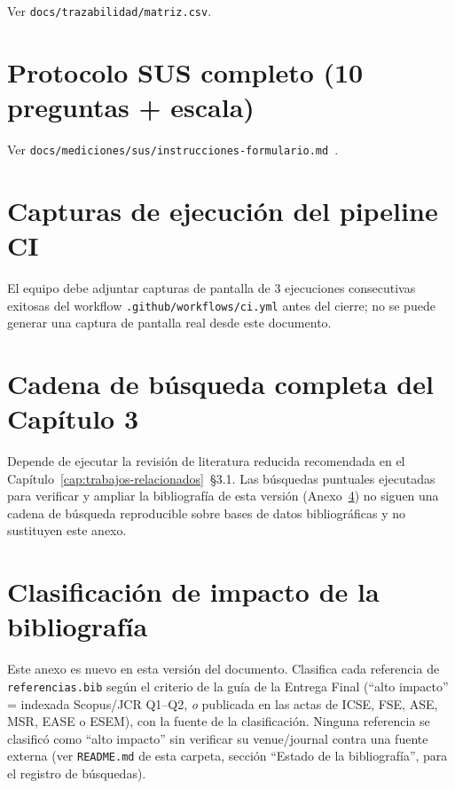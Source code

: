 Ver \texttt{docs/trazabilidad/matriz.csv}.

\chapter{Protocolo SUS completo (10 preguntas + escala)}
\label{anexo:g}

Ver \texttt{docs/mediciones/sus/instrucciones-formulario.md}~\cite{BROOKE1996}.

\chapter{Capturas de ejecución del pipeline CI}
\label{anexo:h}

El equipo debe adjuntar capturas de pantalla de 3 ejecuciones
consecutivas exitosas del workflow \texttt{.github/workflows/ci.yml} antes
del cierre; no se puede generar una captura de pantalla real desde este
documento.

\chapter{Cadena de búsqueda completa del Capítulo 3}
\label{anexo:i}

Depende de ejecutar la revisión de literatura reducida
recomendada en el Capítulo~\ref{cap:trabajos-relacionados}~\S3.1. Las
búsquedas puntuales ejecutadas para verificar y ampliar la bibliografía de
esta versión (Anexo~\ref{anexo:j}) no siguen una cadena de búsqueda
reproducible sobre bases de datos bibliográficas y no sustituyen este
anexo.

\chapter{Clasificación de impacto de la bibliografía}
\label{anexo:j}

Este anexo es nuevo en esta versión del documento. Clasifica cada
referencia de \texttt{referencias.bib} según el criterio de la guía de la
Entrega Final (``alto impacto'' = indexada Scopus/JCR Q1--Q2, \emph{o}
publicada en las actas de ICSE, FSE, ASE, MSR, EASE o ESEM), con la fuente
de la clasificación. Ninguna referencia se clasificó como ``alto impacto''
sin verificar su venue/journal contra una fuente externa (ver
\texttt{README.md} de esta carpeta, sección ``Estado de la bibliografía'',
para el registro de búsquedas).


